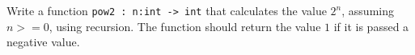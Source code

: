 Write a function \lstinline{pow2 : n:int -> int} that calculates the value $2^n$, assuming $n >= 0$, using recursion. The function should return the value $1$ if it is passed a negative value.
